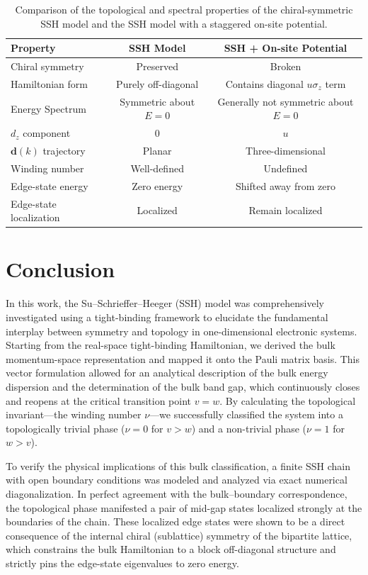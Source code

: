 \documentclass[11pt, a4paper]{article}
\begin{document}
\begin{table}[htbp]
\centering
\caption{Comparison of the topological and spectral properties of the chiral-symmetric SSH model and the SSH model with a staggered on-site potential.}
\label{tab:sshcomparison}
\renewcommand{\arraystretch}{1.3}
\begin{tabular}{@{}lcc@{}}
\toprule
\textbf{Property} & \textbf{SSH Model} & \textbf{SSH + On-site Potential} \\
\midrule
Chiral symmetry & Preserved & Broken \\
Hamiltonian form & Purely off-diagonal & Contains diagonal $u\sigma_z$ term \\
Energy Spectrum & Symmetric about $E=0$ & Generally not symmetric about $E=0$ \\
$d_z$ component & $0$ & $u$ \\
$\mathbf{d}(k)$ trajectory & Planar & Three-dimensional \\
Winding number & Well-defined & Undefined  \\
Edge-state energy & Zero energy & Shifted away from zero \\
Edge-state localization & Localized & Remain localized \\

\bottomrule
\end{tabular}
\end{table}

\clearpage

\section{Conclusion}

In this work, the Su--Schrieffer--Heeger (SSH) model was comprehensively investigated using a tight-binding framework to elucidate the fundamental interplay between symmetry and topology in one-dimensional electronic systems. Starting from the real-space tight-binding Hamiltonian, we derived the bulk momentum-space representation and mapped it onto the Pauli matrix basis. This vector formulation allowed for an analytical description of the bulk energy dispersion and the determination of the bulk band gap, which continuously closes and reopens at the critical transition point $v=w$. By calculating the topological invariant—the winding number $\nu$—we successfully classified the system into a topologically trivial phase ($\nu=0$ for $v>w$) and a non-trivial phase ($\nu=1$ for $w>v$).

To verify the physical implications of this bulk classification, a finite SSH chain with open boundary conditions was modeled and analyzed via exact numerical diagonalization. In perfect agreement with the bulk--boundary correspondence, the topological phase manifested a pair of mid-gap states localized strongly at the boundaries of the chain. These localized edge states were shown to be a direct consequence of the internal chiral (sublattice) symmetry of the bipartite lattice, which constrains the bulk Hamiltonian to a block off-diagonal structure and strictly pins the edge-state eigenvalues to zero energy. 
\end{document}
